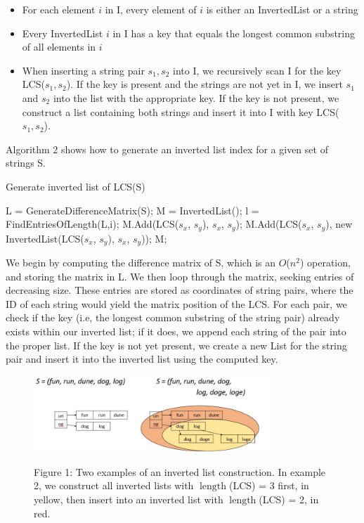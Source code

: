 \documentclass[pdftex,12pt,letter]{article}
\DeclareMathOperator{\length}{length}
\begin{document}
\begin{itemize}
\item For each element $i$ in I, every element of $i$ is either an InvertedList or a string
\item Every InvertedList $i$ in I has a key that equals the longest common substring of all elements in $i$
\item When inserting a string pair $s_1, s_2$ into I, we recursively scan I for the key LCS($s_1, s_2$). If the key is present and the strings are not yet in I, we insert $s_1$ and $s_2 $ into the list with the appropriate key. If the key is not present, we construct a list containing both strings and insert it into I with key LCS($s_1, s_2$).
\end{itemize}

Algorithm 2 shows how to generate an inverted list index for a given set of strings S.
\newpage
\begin{algorithm}
\caption{Generate inverted list of LCS(S)}
\label{Algorithm 2}
\begin{algorithmic}[1]
\STATE L = GenerateDifferenceMatrix(S);
\STATE M = InvertedList();
\FOR{$i = \max(\length(s_1), ..., \length(s_n))$ \textbf{to} $0$}
\STATE l = FindEntriesOfLength(L,i);
\STATE M.Add(LCS($s_x$, $s_y$), $s_x$, $s_y$);
\ELSE
\STATE M.Add(LCS($s_x$, $s_y$), new InvertedList(LCS($s_x$, $s_y$), $s_x$, $s_y$));
\ENDIF
\ENDFOR
\ENDFOR
\RETURN M;
\end{algorithmic}
\end{algorithm}

We begin by computing the difference matrix of S, which is an $O$($n^2$) operation, and storing the matrix in L. We then loop through the matrix, seeking entries of decreasing size. These entries are stored as coordinates of string pairs, where the ID of each string would yield the matrix position of the LCS. For each pair, we check if the key (i.e, the longest common substring of the string pair) already exists within our inverted list; if it does, we append each string of the pair into the proper list. If the key is not yet present, we create a new List for the string pair and insert it into the inverted list using the computed key.

\begin{figure}[h!]
\centering
\includegraphics[width=0.8\textwidth]{invertedList.jpg}
\begin{center}
Figure 1: Two examples of an inverted list construction. In example 2, we construct all inverted lists with $\length$(LCS) = 3 first, in yellow, then insert into an inverted list with $\length$(LCS) = 2, in red.
\end{center}
\end{figure}
\end{document}

